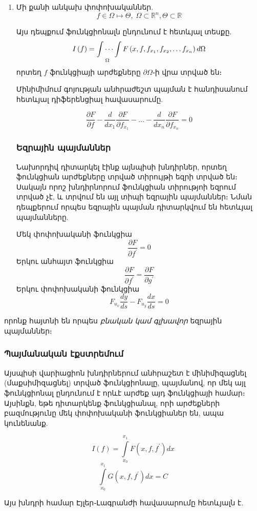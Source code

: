 \documentclass[fleqn, bachelor,subf,12pt,notitlepage]{disser}
\begin{document}
\begin{enumerate}
\item Մի քանի անկախ փոփոխականներ.
$$f \in \Omega \mapsto \Theta, \; \Omega \subset \mathbb{R}^{n}, \Theta \subset \mathbb{R}$$

\noindent Այս դեպքում ֆունկցիոնալն ընդունում է հետևյալ տեսքը.
$$I\left(f\right) = \idotsint \limits_{\Omega} F\left(x, f, f_{x_{1}}, f_{x_{2}}, \dots f_{x_{n} }\right)d\Omega$$
\noindent որտեղ $f$ ֆունկցիայի արժեքները $\partial \Omega$֊ի վրա տրված են։

\noindent Մինիմիմում գոյության անհրաժեշտ պայման է հանդիսանում հետևյալ դիֆերենցիալ հավասարումը.

$$\dfrac{\partial F}{\partial f} - \dfrac{d}{dx_{1}}\dfrac{\partial F}{\partial f_{x_{1}}} - \dots -\dfrac{d}{dx_{n}}\dfrac{\partial F}{\partial f_{x_{n}}}=0$$

\newpage
\subsubsection*{Եզրային պայմաններ}
Նախորդիվ դիտարկել էինք այնպիսի խնդիրներ, որտեղ ֆունկցիան արժեքները տրված տիրույթի եզրի տրված են։
Սակայն որոշ խնդիրնորում ֆունկցիան տիրությոի եզրում տրված չէ, և տրվում են այլ տիպի եզրային պայմաններ։
Նման դեպքերում որպես եզրային պայման դիտարկվում են հետևյալ պայմանները.

Մեկ փոփոխականի ֆունկցիա
$$\dfrac{\partial F}{\partial f^{'}}=0$$
Երկու անհայտ ֆունկցիա
$$\dfrac{\partial F}{\partial f^{'}}=\dfrac{\partial F}{\partial g^{'}}$$
Երկու փոփոխականի ֆունկցիա
$$F_{u_{x}}\dfrac{dy}{ds}-F_{u_{y}}\dfrac{dx}{ds}=0$$
\end{enumerate}

\noindent որոնք հայտնի են որպես \emph{բնական կամ գլխավոր}  եզրային պայմաններ։

\subsubsection*{Պայմանական էքստրեմում}
Այսպիսի վարիացիոն խնդիրներում անհրաշետ է մինիմիզացնել (մաքսիմիզացնել) տրված ֆունկցիոնալը, պայմանով, որ մեկ այլ ֆունկցիոնալ ընդունում է որևէ արժեք այդ ֆունկցիայի համար։ Այսինքն, եթե դիտարկենք ֆունկցիանալ, որի արժեքների բազմությունը մեկ փոփոխականի ֆունկցիաներ են, ապա կունենանք.

$$I\left(f\right)=\int \limits_{x_{0}}^{x_{1}} F\left(x, f, f^{'}\right)dx $$
$$\int \limits_{x_{0}}^{x_{1}} G\left(x, f, f^{'}\right)dx = C$$

Այս խնդրի համար Էյլեր֊Լագրանժի հավասարումը հետևյալն է.
\end{document}
